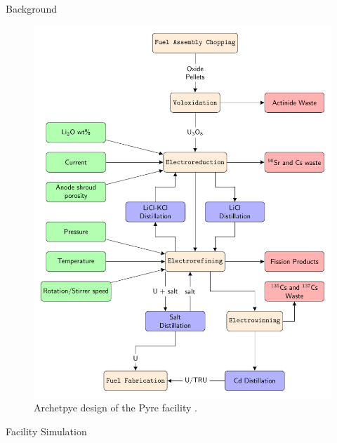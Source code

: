 \documentclass[final]{beamer}
\newlength{\onecolwid}
\newlength{\threecolwid}
\begin{document}
\begin{frame}[t]
\begin{columns}[t,totalwidth=\threecolwid]
\begin{column}{\onecolwid}
\begin{block}{Background}


\begin{figure}
	\includegraphics[width=\linewidth]{flowchart.pdf}
	\caption{Archetpye design of the Pyre facility \cite{Borrelli_2017}.}
\end{figure}

\end{block}


\begin{block}{Facility Simulation}


\end{block}
\end{column}
\end{columns}
\end{frame}
\end{document}
